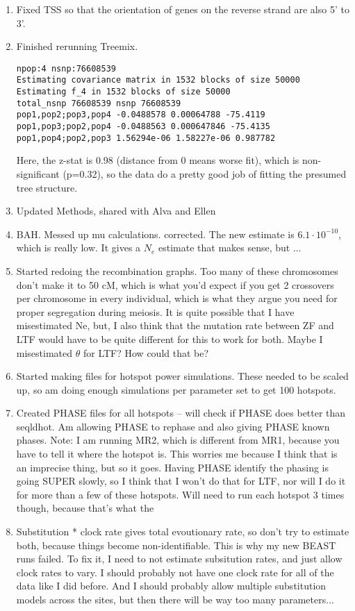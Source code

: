 \documentclass[idxtotoc,hyperref,openany,oneside]{labbook} %
\begin{document}
\begin{enumerate}
\item Fixed TSS so that the orientation of genes on the reverse strand are also 5' to 3'.
\item Finished rerunning Treemix.
\begin{verbatim}
npop:4 nsnp:76608539
Estimating covariance matrix in 1532 blocks of size 50000
Estimating f_4 in 1532 blocks of size 50000
total_nsnp 76608539 nsnp 76608539
pop1,pop2;pop3,pop4 -0.0488578 0.00064788 -75.4119
pop1,pop3;pop2,pop4 -0.0488563 0.000647846 -75.4135
pop1,pop4;pop2,pop3 1.56294e-06 1.58227e-06 0.987782
\end{verbatim}
Here, the z-stat is 0.98 (distance from 0 means worse fit), which is non-significant (p=0.32), so the data do a pretty good job of fitting the presumed tree structure.
\item Updated Methods, shared with Alva and Ellen
\item BAH. Messed up mu calculations. corrected. The new estimate is $6.1 \cdot 10^{-10}$, which is really low. It gives a $N_e$ estimate that makes sense, but ...
\item Started redoing the recombination graphs. Too many of these chromosomes don't make it to 50 cM, which is what you'd expect if you get 2 crossovers per chromosome in every individual, which is what they argue you need for proper segregation during meiosis. It is quite possible that I have misestimated Ne, but, I also think that the mutation rate between ZF and LTF would have to be quite different for this to work for both. Maybe I misestimated $\theta$ for LTF? How could that be?
\item Started making files for hotspot power simulations. These needed to be scaled up, so am doing enough simulations per parameter set to get 100 hotspots.
\item Created PHASE files for all hotspots -- will check if PHASE does better than seqldhot. Am allowing PHASE to rephase and also giving PHASE known phases. Note: I am running MR2, which is different from MR1, because you have to tell it where the hotspot is. This worries me because I think that is an imprecise thing, but so it goes. Having PHASE identify the phasing is going SUPER slowly, so I think that I won't do that for LTF, nor will I do it for more than a few of these hotspots. Will need to run each hotspot 3 times though, because that's what the 
\item Substitution * clock rate gives total evoutionary rate, so don't try to estimate both, because things become non-identifiable. This is why my new BEAST runs failed. To fix it, I need to not estimate subsitution rates, and just allow clock rates to vary. I should probably not have one clock rate for all of the data like I did before. And I should probably allow multiple substitution models across the sites, but then there will be way too many parameters...
\end{enumerate}
\end{document}
